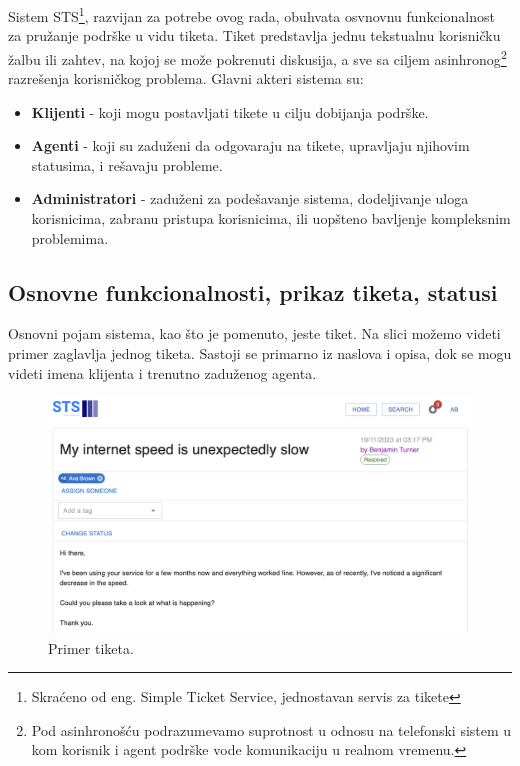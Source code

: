 \documentclass[12pt,oneside]{memoir}
\begin{document}
Sistem STS\footnote{Skraćeno od eng. Simple Ticket Service, jednostavan servis za tikete}, razvijan za potrebe ovog rada, obuhvata osvnovnu funkcionalnost za pružanje podrške u vidu tiketa. Tiket predstavlja jednu tekstualnu korisničku žalbu ili zahtev, na kojoj se može pokrenuti diskusija, a sve sa ciljem asinhronog\footnote{Pod asinhronošću podrazumevamo suprotnost u odnosu na telefonski sistem u kom korisnik i agent podrške vode komunikaciju u realnom vremenu.} razrešenja korisničkog problema. Glavni akteri sistema su:

\begin{itemize}
    \item \textbf{Klijenti} - koji mogu postavljati tikete u cilju dobijanja podrške.
    \item \textbf{Agenti} - koji su zaduženi da odgovaraju na tikete, upravljaju njihovim statusima, i rešavaju probleme.
    \item \textbf{Administratori} - zaduženi za podešavanje sistema, dodeljivanje uloga korisnicima, zabranu pristupa korisnicima, ili uopšteno bavljenje kompleksnim problemima.
\end{itemize}

\subsection{Osnovne funkcionalnosti, prikaz tiketa, statusi}

Osnovni pojam sistema, kao što je pomenuto, jeste tiket. Na slici možemo videti primer zaglavlja jednog tiketa. Sastoji se primarno iz naslova i opisa, dok se mogu videti imena klijenta i trenutno zaduženog agenta.

\begin{figure}[h]
  \centering
  \includegraphics[width=1\textwidth]{docs/images/ch_1/ticket-title.png} 
  \caption{Primer tiketa.}
\end{figure}
\end{document}
